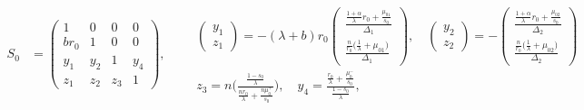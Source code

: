 \documentclass[a4paper,11pt]{article}
\theoremstyle{remark}
\begin{document}
\begin{equation} \label{eq:S0}
\begin{aligned}
 S_0&=
 \begin{pmatrix}
    1 & 0 & 0 & 0\\
    br_0 & 1 & 0 & 0\\
    y_1 & y_2 & 1 & y_4\\
    z_1 & z_2 & z_3 &1
 \end{pmatrix},
 \quad \quad
 \begin{array}{l}
\begin{pmatrix}
 y_1\\z_1
\end{pmatrix}
=-(\lambda+b)r_0\begin{pmatrix}
  \frac{ \frac{1+\alpha}{\lambda}r_0 + \frac{\mu_{01}}{s_0} }{ \Delta_1 }\\
  \frac{ \frac{n}{r_0}\big(\frac{1}{\lambda} + \mu_{01}\big) }{ \Delta_1 }
  \end{pmatrix},
  \quad
 \begin{pmatrix}
 y_2\\z_2
\end{pmatrix}
=-\begin{pmatrix}
  \frac{ \frac{1+\alpha}{\lambda}r_0 + \frac{\mu_{02}}{s_0} }{ \Delta_2 }\\
  \frac{ \frac{n}{r_0}\big(\frac{1}{\lambda} + \mu_{02}\big) }{ \Delta_2 }
  \end{pmatrix}\\
 z_3=n\bigg(\frac{\frac{1-s_0}{\lambda}}{\frac{n r_0}{\lambda} + \frac{n\mu_{0}^+}{s_0}}\bigg),\quad y_4=\frac{\frac{r_0}{\lambda}+\frac{\mu_0^-}{s_0}}{\frac{1-s_0}{\lambda}},
 \end{array}
\end{aligned}
\end{equation}
\end{document}
